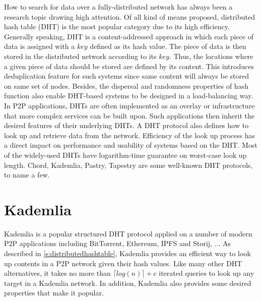 How to search for data over a fully-distributed network has always been a research topic drawing high attention. Of all kind of means proposed, distributed hash table (DHT) is the most popular category due to its high efficiency. Generally speaking, DHT is a content-addressed approach in which each piece of data is assigned with a $key$ defined as its hash value. The piece of data is then stored in the distributed network according to its $key$. Thus, the locations where a given piece of data should be stored are defined by its content. This introduces deduplication feature for such systems since same content will always be stored on same set of nodes. Besides, the dispersal and randomness properties of hash function also enable DHT-based systems to be designed in a load-balancing way. In P2P applications, DHTs are often implemented as an overlay or infrastructure that more complex services can be built upon. Such applications then inherit the desired features of their underlying DHTs. A DHT protocol also defines how to look up and retrieve data from the network. Efficiency of the look up process has a direct impact on performance and usability of systems based on the DHT. Most of the widely-used DHTs have logarithm-time guarantee on worst-case look up length. Chord\cite{stoica2001chord}, Kademlia\cite{maymounkov2002kademlia}, Pastry\cite{rowstron2001pastry}, Tapestry\cite{zhao2004tapestry} are some well-known DHT protocols, to name a few.


\section{Kademlia}
\label{s:kademlia}
Kademlia is a popular structured DHT protocol applied on a number of modern P2P applications including BitTorrent\cite{bittorrent}, Ethereum\cite{ethereum}, IPFS\cite{ipfs} and Storij\cite{storij}, ... As described in \ref{s:distributedhashtable}, Kademlia provides an efficient way to look up contents in a P2P network given their hash values. Like many other DHT alternatives, it takes no more than $\lceil log(n) \rceil + c$ iterated queries to look up any target in a Kademlia network\cite{maymounkov2002kademlia}. In addition, Kademlia also provides some desired properties that make it popular.

